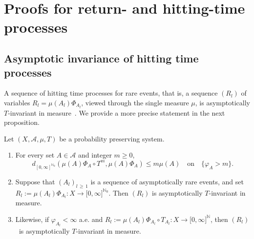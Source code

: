 \documentclass[AHL,Unicode,longabstracts]{cedram}
\newcommand{\clA}{\mathcal{A}}
\newcommand{\bbN}{\mathbb{N}}
\newcommand*{\alphenumi}{\renewcommand*{\theenumi}{\alph{enumi}}}
\begin{document}
\section{Proofs for return- and hitting-time processes}\label{S_PfsRH}


\subsection{Asymptotic invariance of hitting time processes}
A sequence of hitting time processes for rare events, that is, a sequence $(R_{l})$ of variables $R_{l}=\mu(A_{l})\Phi_{A_{l}}$, viewed through the single measure $\mu$, is asymptotically $T$-invariant in measure~\cite[Corollary~6]{Z7}. We provide a more precise statement in the next proposition.

\begin{prop}\label{P_AsyInvarHitProc}
Let $(X,\clA,\mu,T)$ be a probability preserving system.
\begin{enumerate}\alphenumi
\item\label{prop7.1.a} For every set $A\in\clA$ and integer $m\geq0$,
\begin{equation}\label{Eq_uzuzuzuzu}
d_{[0,\infty]^{\bbN_{0}}}\left(\mu(A)\Phi_{A}\circ T^{m},\mu(A)\Phi_{A}\right)\leq m\mu(A) \quad\text{on} \quad\{\varphi_{A}>m\}. 
\end{equation}
\item\label{prop7.1.b} Suppose that $(A_{l})_{l\,\geq\,1}$ is a sequence of asymptotically rare events, and set $R_{l}:=\mu(A_{l})\Phi_{A_{l}}:X\rightarrow
\lbrack0,\infty]^{\bbN_{0}}$. Then $(R_{l})$ is asymptotically $T$-invariant in measure.
\item\label{prop7.1.c} Likewise, if $ \varphi_{A_{l}} <
\infty$ a.e. and $R_{l}:=\mu (A_{l})\Phi_{A_{l}}\circ T_{A_{l}}:X\rightarrow\lbrack0,\infty]^{\bbN}$, then $(R_{l})$\emph{\ }is asymptotically $T$-invariant in measure.
\end{enumerate}
\end{prop}
\end{document}
